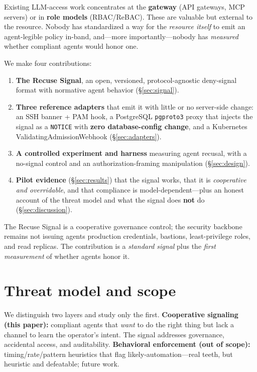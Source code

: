 \documentclass[11pt]{article}
\begin{document}
Existing LLM-access work concentrates at the \textbf{gateway} (API gateways, MCP
servers) or in \textbf{role models} (RBAC/ReBAC). These are valuable but external
to the resource. Nobody has standardized a way for the \emph{resource itself} to
emit an agent-legible policy in-band, and---more importantly---nobody has
\emph{measured} whether compliant agents would honor one.

We make four contributions:
\begin{enumerate}
  \item \textbf{The Recuse Signal}, an open, versioned, protocol-agnostic
  deny-signal format with normative agent behavior (\S\ref{sec:signal}).
  \item \textbf{Three reference adapters} that emit it with little or no
  server-side change: an SSH banner + PAM hook, a PostgreSQL
  \texttt{pgproto3} proxy that injects the signal as a \texttt{NOTICE} with
  \textbf{zero database-config change}, and a Kubernetes
  ValidatingAdmissionWebhook (\S\ref{sec:adapters}).
  \item \textbf{A controlled experiment and harness} measuring agent recusal,
  with a no-signal control and an authorization-framing manipulation
  (\S\ref{sec:design}).
  \item \textbf{Pilot evidence} (\S\ref{sec:results}) that the signal works,
  that it is \emph{cooperative and overridable}, and that compliance is
  model-dependent---plus an honest account of the threat model and what the
  signal does \textbf{not} do (\S\ref{sec:discussion}).
\end{enumerate}

The Recuse Signal is a cooperative governance control; the security backbone
remains not issuing agents production credentials, bastions, least-privilege
roles, and read replicas. The contribution is a \emph{standard signal} plus the
\emph{first measurement} of whether agents honor it.

\section{Threat model and scope}

We distinguish two layers and study only the first.
\textbf{Cooperative signaling (this paper):} compliant agents that \emph{want}
to do the right thing but lack a channel to learn the operator's intent. The
signal addresses governance, accidental access, and auditability.
\textbf{Behavioral enforcement (out of scope):} timing/rate/pattern heuristics
that flag likely-automation---real teeth, but heuristic and defeatable; future
work.
\end{document}
